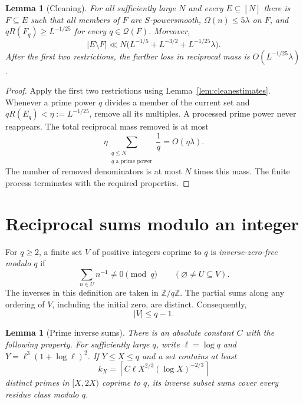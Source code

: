 \documentclass[11pt,leqno]{amsart}
\numberwithin{equation}{section}
\newtheorem{lemma}[theorem]{Lemma}
\theoremstyle{definition}
\theoremstyle{remark}
\newcommand{\Z}{\mathbb Z}
\newcommand{\pp}{\mathcal Q}
\newcommand{\card}[1]{\lvert #1\rvert}
\newcommand{\ceil}[1]{\left\lceil #1\right\rceil}
\begin{document}
\begin{lemma}[Cleaning]\label{lem:cleaning}
For all sufficiently large $N$ and every $E\subseteq[N]$ there is
$F\subseteq E$ such that all members
of $F$ are $S$-powersmooth, $\Omega(n)\le5\lambda$ on $F$, and
$qR(F_q)\ge L^{-1/25}$ for every $q\in\pp(F)$. Moreover,
\begin{equation}\label{eq:cleanloss}
 \card{E\setminus F}
 \ll N\bigl(L^{-1/5}+L^{-3/2}+L^{-1/25}\lambda\bigr).
\end{equation}
After the first two restrictions, the further loss in reciprocal mass is
$O(L^{-1/25}\lambda)$.
\end{lemma}

\begin{proof}
Apply the first two restrictions using Lemma~\ref{lem:cleanestimates}.
Whenever a prime power $q$ divides a member of the current set and
$qR(E_q)<\eta:=L^{-1/25}$, remove all its multiples.
A processed prime power never reappears. The total reciprocal mass
removed is at most
\[
 \eta\sum_{\substack{q\le N\\q\text{ a prime power}}}\frac1q
 =O(\eta\lambda).
\]
The number of removed denominators is at most $N$ times this mass.
The finite process terminates with the required properties.
\end{proof}

\section{Reciprocal sums modulo an integer}\label{sec:modular}

For $q\ge2$, a finite set $V$ of positive integers coprime to $q$ is
\emph{inverse-zero-free modulo $q$} if
\[
 \sum_{n\in U}n^{-1}\ne0\pmod q
 \qquad(\varnothing\ne U\subseteq V).
\]
The inverses in this definition are taken in $\Z/q\Z$.
The partial sums along any ordering of $V$, including the initial zero,
are distinct. Consequently,
\begin{equation}\label{eq:length}
 \card V\le q-1.
\end{equation}

\begin{lemma}[Prime inverse sums]\label{lem:primecover}
There is an absolute constant $C$ with the following property.
For sufficiently large $q$, write $\ell=\log q$ and
$Y=\ell^3(1+\log\ell)^2$. If $Y\le X\le q$ and a set contains at least
\[
 k_X=\ceil{C\ell X^{2/3}(\log X)^{-2/3}}
\]
distinct primes in $[X,2X)$ coprime to $q$, its inverse subset sums cover
every residue class modulo $q$.
\end{lemma}
\end{document}
